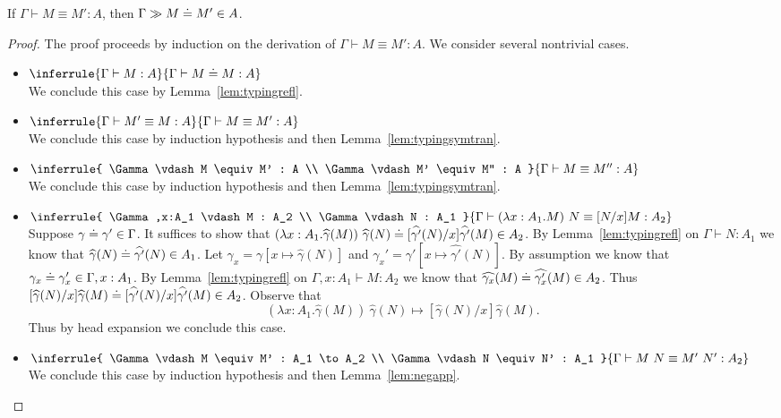 \documentclass{article}
\newcommand{\G}{\Gamma}
\newcommand{\entails}{\vdash}
\newcommand{\eapp}[2]{#1~#2}
\newcommand{\eabs}[3]{\lambda #1:#2.#3}
\newcommand{\stepto}{\mapsto}
\begin{document}
\begin{theorem}[FTLR]
If $\G \entails M \equiv M' : A$, then $\G \gg M \eeq M' \in A$.
\end{theorem}
\begin{proof}
The proof proceeds by induction on the derivation of $\G \entails M \equiv M' : A$.
We consider several nontrivial cases.
\begin{itemize}
    \item $\inferrule{ \G \entails M : A }{ \G \entails M \eeq M : A }$\\
    We conclude this case by Lemma~\ref{lem:typingrefl}.
    \item $\inferrule{ \G \entails M' \equiv M : A }{ \G \entails M \equiv M' : A }$\\
    We conclude this case by induction hypothesis and then Lemma~\ref{lem:typingsymtran}.
    \item $\inferrule{ \G \entails M \equiv M' : A \\ \G \entails M' \equiv M'' : A }{ \G \entails M \equiv M'' : A }$\\
    We conclude this case by induction hypothesis and then Lemma~\ref{lem:typingsymtran}.
    
    \item $\inferrule{ \G,x:A_1 \entails M : A_2 \\ \G \entails N : A_1 }{ \G \entails \eapp{(\eabs{x}{A_1}{M})}{N} \equiv [N/x]M : A_2 }$\\
    Suppose $\gamma \eeq \gamma' \in \G$.
    It suffices to show that $\eapp{(\eabs{x}{A_1}{\widehat{\gamma}(M)})}{\widehat{\gamma}(N)} \eeq [\widehat{\gamma'}(N)/x]\widehat{\gamma'}(M) \in A_2$.
    By Lemma~\ref{lem:typingrefl} on $\G \entails N : A_1$ we know that $\widehat{\gamma}(N) \doteq \widehat{\gamma'}(N) \in A_1$.
    Let $\gamma_x = \gamma[x \mapsto \widehat{\gamma}(N)]$ and $\gamma_x' = \gamma'[x \mapsto \widehat{\gamma'}(N)]$.
    By assumption we know that $\gamma_x \eeq \gamma_x' \in \G,x:A_1$.
    By Lemma~\ref{lem:typingrefl} on $\G,x:A_1 \entails M : A_2$ we know that $\widehat{\gamma_x}(M) \doteq \widehat{\gamma_x'}(M) \in A_2$.
    Thus $[\widehat{\gamma}(N)/x]\widehat{\gamma}(M) \doteq [\widehat{\gamma'}(N)/x]\widehat{\gamma'}(M) \in A_2$.
    Observe that
    \[
    \eapp{(\eabs{x}{A_1}{\widehat{\gamma}(M)})}{\widehat{\gamma}(N)} \stepto [\widehat{\gamma}(N)/x]\widehat{\gamma}(M).
    \]
    Thus by head expansion we conclude this case.
    
    \item $\inferrule{ \G \entails M \equiv M' : A_1 \to A_2 \\ \G \entails N \equiv N' : A_1 }{ \G \entails \eapp{M}{N} \equiv \eapp{M'}{N'} : A_2 }$\\
    We conclude this case by induction hypothesis and then Lemma~\ref{lem:negapp}.
    

\end{itemize}
\end{proof}
\end{document}
